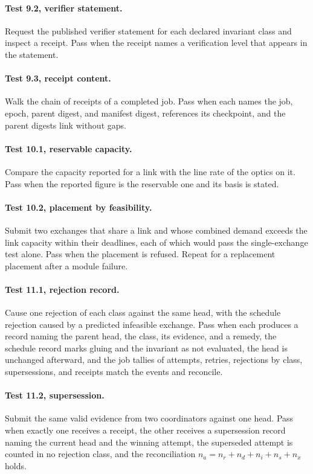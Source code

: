 \documentclass[11pt,openany]{book}
\theoremstyle{remark}
\begin{document}
\paragraph{Test 9.2, verifier statement.} Request the published verifier statement for each declared invariant class and inspect a receipt. Pass when the receipt names a verification level that appears in the statement.

\paragraph{Test 9.3, receipt content.} Walk the chain of receipts of a completed job. Pass when each names the job, epoch, parent digest, and manifest digest, references its checkpoint, and the parent digests link without gaps.

\paragraph{Test 10.1, reservable capacity.} Compare the capacity reported for a link with the line rate of the optics on it. Pass when the reported figure is the reservable one and its basis is stated.

\paragraph{Test 10.2, placement by feasibility.} Submit two exchanges that share a link and whose combined demand exceeds the link capacity within their deadlines, each of which would pass the single-exchange test alone. Pass when the placement is refused. Repeat for a replacement placement after a module failure.

\paragraph{Test 11.1, rejection record.} Cause one rejection of each class against the same head, with the schedule rejection caused by a predicted infeasible exchange. Pass when each produces a record naming the parent head, the class, its evidence, and a remedy, the schedule record marks gluing and the invariant as not evaluated, the head is unchanged afterward, and the job tallies of attempts, retries, rejections by class, supersessions, and receipts match the events and reconcile.

\paragraph{Test 11.2, supersession.} Submit the same valid evidence from two coordinators against one head. Pass when exactly one receives a receipt, the other receives a supersession record naming the current head and the winning attempt, the superseded attempt is counted in no rejection class, and the reconciliation $n_a=n_r+n_d+n_i+n_s+n_x$ holds.
\end{document}
